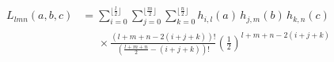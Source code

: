 \begin{align}
L_{lmn}(a,b,c) &= 
\sum_{i=0}^{\lfloor\frac{l}{2}\rfloor}
\sum_{j=0}^{\lfloor\frac{m}{2}\rfloor}
\sum_{k=0}^{\lfloor\frac{n}{2}\rfloor}
h_{i,l}(a)\, h_{j,m}(b)\, h_{k,n}(c) \\
&\quad\;\, \times 
\frac{(l+m+n-2(i+j+k))!}
     { \left( \frac{l+m+n}{2} - (i+j+k) \right)! }
\left( \frac{1}{2} \right)^{l+m+n-2(i+j+k)}
\end{align}
